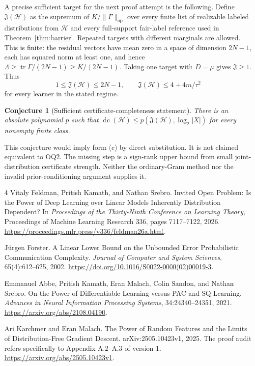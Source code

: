 \documentclass[11pt]{article}
\newtheorem*{conjecture}{Conjecture}
\DeclareMathOperator{\dc}{dc}
\DeclareMathOperator{\tr}{tr}
\newcommand{\1}{\mathbf 1}
\newcommand{\cH}{\mathcal H}
\newcommand{\op}{\mathrm{op}}
\begin{document}
A precise sufficient target for the next proof attempt is the following. Define $\mathfrak J(\cH)$ as the supremum of $K/\|\Gamma\|_\op$ over every finite list of realizable labeled distributions from $\cH$ and every full-support fair-label reference used in Theorem~\ref{thm:barrier}. Repeated targets with different marginals are allowed. This is finite: the residual vectors have mean zero in a space of dimension $2N-1$, each has squared norm at least one, and hence $\Lambda\geq\tr\Gamma/(2N-1)\geq K/(2N-1)$. Taking one target with $D=\mu$ gives $\mathfrak J\geq1$. Thus
\[
 1\leq\mathfrak J(\cH)\leq2N-1,\qquad
 \mathfrak J(\cH)\leq4+4m/\tau^2
\]
for every learner in the stated regime.
\begin{conjecture}[Sufficient certificate-completeness statement]
There is an absolute polynomial $p$ such that
$\dc(\cH)\leq p(\mathfrak J(\cH),\log_2|X|)$ for every nonempty finite class.
\end{conjecture}
This conjecture would imply form (c) by direct substitution. It is not claimed equivalent to OQ2. The missing step is a sign-rank upper bound from small joint-distribution certificate strength. Neither the ordinary-Gram method nor the invalid prior-conditioning argument supplies it.

\begin{thebibliography}{4}
Vitaly Feldman, Pritish Kamath, and Nathan Srebro.
Invited Open Problem: Is the Power of Deep Learning over Linear Models Inherently Distribution Dependent?
In \emph{Proceedings of the Thirty-Ninth Conference on Learning Theory},
Proceedings of Machine Learning Research 336, pages 7117--7122, 2026.
\url{https://proceedings.mlr.press/v336/feldman26a.html}.

J\"urgen Forster.
A Linear Lower Bound on the Unbounded Error Probabilistic Communication Complexity.
\emph{Journal of Computer and System Sciences}, 65(4):612--625, 2002.
\url{https://doi.org/10.1016/S0022-0000(02)00019-3}.

Emmanuel Abbe, Pritish Kamath, Eran Malach, Colin Sandon, and Nathan Srebro.
On the Power of Differentiable Learning versus PAC and SQ Learning.
\emph{Advances in Neural Information Processing Systems}, 34:24340--24351, 2021.
\url{https://arxiv.org/abs/2108.04190}.

Ari Karchmer and Eran Malach.
The Power of Random Features and the Limits of Distribution-Free Gradient Descent.
arXiv:2505.10423v1, 2025. The proof audit refers specifically to Appendix A.2--A.3 of version 1.
\url{https://arxiv.org/abs/2505.10423v1}.
\end{thebibliography}
\end{document}

